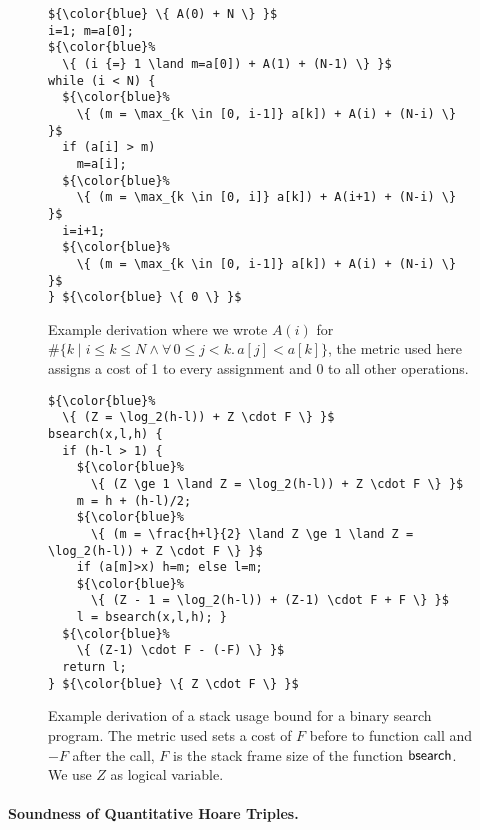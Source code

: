 \documentclass[nocopyrightspace,preprint]{sigplanconf}
\begin{document}
\begin{figure}
\begin{lstlisting}
${\color{blue} \{ A(0) + N \} }$
i=1; m=a[0];
${\color{blue}%
  \{ (i {=} 1 \land m=a[0]) + A(1) + (N-1) \} }$
while (i < N) {
  ${\color{blue}%
    \{ (m = \max_{k \in [0, i-1]} a[k]) + A(i) + (N-i) \} }$
  if (a[i] > m)
    m=a[i];
  ${\color{blue}%
    \{ (m = \max_{k \in [0, i]} a[k]) + A(i+1) + (N-i) \} }$
  i=i+1;
  ${\color{blue}%
    \{ (m = \max_{k \in [0, i-1]} a[k]) + A(i) + (N-i) \} }$
} ${\color{blue} \{ 0 \} }$
\end{lstlisting}
\caption{Example derivation where we wrote $A(i)$
  for $\#\{ k \mid i \le k \le N \land \forall\, 0\le j<k.\, a[j] < a[k]\}$,
  the metric used here assigns a cost of 1 to every assignment
  and 0 to all other operations.
  }
\label{fig:xmplmax}
\end{figure}

\begin{figure}
\begin{lstlisting}
${\color{blue}%
  \{ (Z = \log_2(h-l)) + Z \cdot F \} }$
bsearch(x,l,h) {
  if (h-l > 1) {
    ${\color{blue}%
      \{ (Z \ge 1 \land Z = \log_2(h-l)) + Z \cdot F \} }$
    m = h + (h-l)/2;
    ${\color{blue}%
      \{ (m = \frac{h+l}{2} \land Z \ge 1 \land Z = \log_2(h-l)) + Z \cdot F \} }$
    if (a[m]>x) h=m; else l=m;
    ${\color{blue}%
      \{ (Z - 1 = \log_2(h-l)) + (Z-1) \cdot F + F \} }$
    l = bsearch(x,l,h); }
  ${\color{blue}%
    \{ (Z-1) \cdot F - (-F) \} }$
  return l;
} ${\color{blue} \{ Z \cdot F \} }$
\end{lstlisting}
\caption{Example derivation of a stack usage bound for a binary
  search program.  The metric used sets a cost of $F$ before
  to function call and $-F$ after the call, $F$ is the stack
  frame size of the function $\mathsf{bsearch}$.  We use $Z$ as
  logical variable.
  }
\label{fig:xmplbs}
\end{figure}


\paragraph{Soundness of Quantitative Hoare Triples.}
\end{document}
